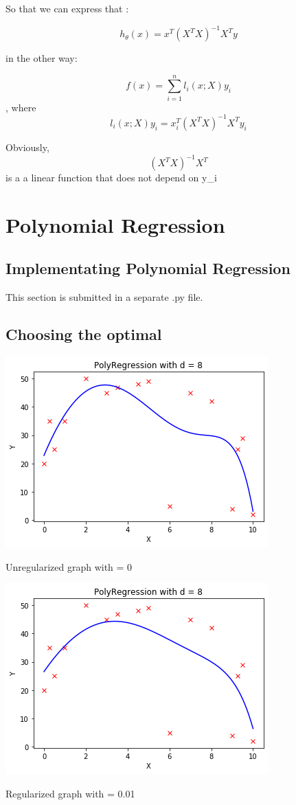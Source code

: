 \documentclass{article}
\begin{document}
So that we can express that :

\[h_{\theta}(x) = x^{T} (X^{T} X)^{-1} X^{T} y\]

in the other way:

\[f(x) = \sum_{i=1}^{n} l_i(x;X)y_{i}\], where\[l_i(x;X)y_{i} = x_{i}^{T} (X^{T} X)^{-1} X^{T} y_{i}  \]

Obviously, \[(X^{T} X)^{-1} X^{T}\] is a a linear function that does not depend on y_{i}

	\section{Polynomial Regression}
		\subsection{Implementating Polynomial Regression}
This section is submitted in a separate .py file.

		\subsection{Choosing the optimal \lambda}

				\includegraphics[width=\linewidth]{Unregularized.png}
				\caption{Unregularized graph with \lambda = 0}
 		
	
				\includegraphics[width=\linewidth]{Regularized.png}
				\caption{Regularized graph with \lambda = 0.01}
\end{document}
